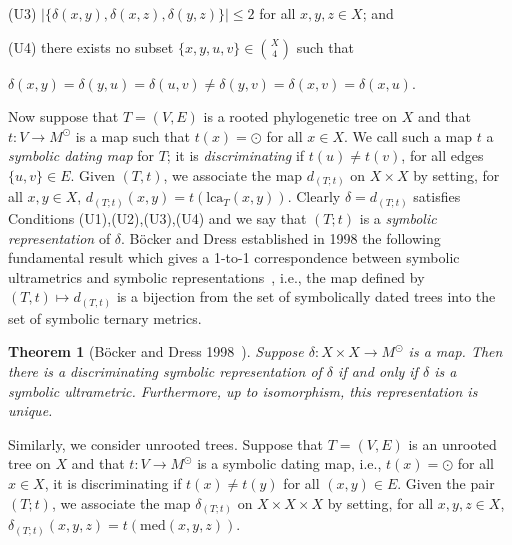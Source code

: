 \documentclass{article}
\newtheorem{theorem}{Theorem}
\begin{document}
(U3) $|\{\delta(x,y),\delta(x,z),\delta(y,z)\}|\leq 2$ for all $x,y,z\in X$; and

(U4) there exists no subset $\{x,y,u,v\} \in {X \choose 4}$ such that

$\delta(x,y) = \delta(y,u) = \delta(u,v) \neq \delta(y,v) = \delta(x,v) = 
\delta(x,u)$.

Now suppose that $T=(V,E)$ is a rooted phylogenetic tree on $X$ and that 
$t:V\to 
M^{\odot}$ is a map such that
$t(x)=\odot$ for all $x\in X$.  
We call such 
a map $t$ a \textit{symbolic dating 
map} for $T$; it is
\textit{discriminating} if $t(u)\neq t(v)$, for all edges $\{u,v\}\in E$. 
Given $(T,t)$, we associate the map $d_{(T;t)}$ on $X\times X$ by setting,
for all $x,y\in X$, $d_{(T;t)}(x,y)=t(\text{lca}_T(x,y))$. Clearly 
$\delta= d_{(T;t)}$ satisfies
Conditions (U1),(U2),(U3),(U4) and we say that $(T;t)$ is a {\em symbolic representation} 
of $\delta$. B\"{o}cker and Dress established in 1998 the following 
fundamental result which gives a
1-to-1 correspondence between symbolic ultrametrics and symbolic 
representations~\cite{Bocker1998},
i.e., the map defined by $(T,t) \mapsto d_{(T,t)}$ is a bijection from the set of
symbolically dated trees into the set of symbolic ternary metrics. 

\begin{theorem}[B\"{o}cker and Dress 1998~\cite{Bocker1998}]\label{thm:rooted}
 Suppose $\delta: X\times X\to M^{\odot}$ is a map. Then there is a 
discriminating symbolic representation of
 $\delta$ if and only if $\delta$ is a symbolic ultrametric. Furthermore, up to 
isomorphism, this representation is unique.
\end{theorem}

Similarly, we consider unrooted trees. Suppose that $T=(V,E)$ is an unrooted 
tree 
on $X$ and that $t:V\to M^{\odot}$ is a symbolic dating map, i.e.,
$t(x)=\odot$ for all $x\in X$, it is discriminating if $t(x)\neq t(y)$ for all $(x,y)\in E$.
Given the pair $(T;t)$, we associate the map 
$\delta_{(T;t)}$ on $X\times X\times X$ by setting,
for all $x,y,z\in X$, $\delta_{(T;t)}(x,y,z)=t(\text{med}(x,y,z))$.
\end{document}
